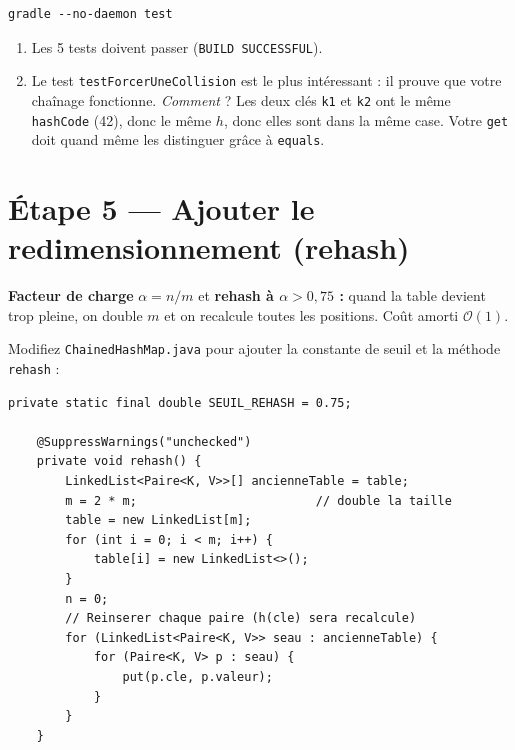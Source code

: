 \documentclass[11pt,a4paper]{article}
\newcommand{\bigO}{\mathcal{O}}
\begin{document}
\begin{lstlisting}[style=bash]
gradle --no-daemon test
\end{lstlisting}

\begin{exercicebox}
\begin{enumerate}[nosep]
    \item Les 5 tests doivent passer (\texttt{BUILD SUCCESSFUL}).
    \item Le test \texttt{testForcerUneCollision} est le plus intéressant : il prouve que votre chaînage fonctionne. \emph{Comment} ? Les deux clés \texttt{k1} et \texttt{k2} ont le même \texttt{hashCode} (42), donc le même $h$, donc elles sont dans la même case. Votre \texttt{get} doit quand même les distinguer grâce à \texttt{equals}.
\end{enumerate}
\end{exercicebox}

\section{Étape 5 --- Ajouter le redimensionnement (rehash)}

\begin{lienbox}[Ce qu'on matérialise du CM]
\textbf{Facteur de charge} $\alpha = n/m$ et \textbf{rehash à $\alpha > 0{,}75$ :} quand la table devient trop pleine, on double $m$ et on recalcule toutes les positions. Coût amorti $\bigO(1)$.
\end{lienbox}

Modifiez \texttt{ChainedHashMap.java} pour ajouter la constante de seuil et la méthode \texttt{rehash} :

\begin{lstlisting}[style=java]
    private static final double SEUIL_REHASH = 0.75;

    @SuppressWarnings("unchecked")
    private void rehash() {
        LinkedList<Paire<K, V>>[] ancienneTable = table;
        m = 2 * m;                         // double la taille
        table = new LinkedList[m];
        for (int i = 0; i < m; i++) {
            table[i] = new LinkedList<>();
        }
        n = 0;
        // Reinserer chaque paire (h(cle) sera recalcule)
        for (LinkedList<Paire<K, V>> seau : ancienneTable) {
            for (Paire<K, V> p : seau) {
                put(p.cle, p.valeur);
            }
        }
    }
\end{lstlisting}
\end{document}
